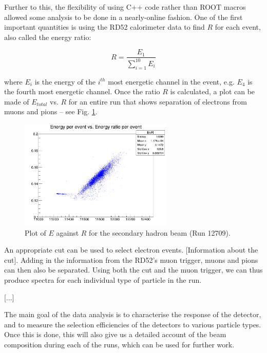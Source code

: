 Further to this, the flexibility of using C++ code rather than ROOT macros allowed some analysis to be done in a nearly-online fashion. One of the first important quantities is using the RD52 calorimeter data to find $R$ for each event, also called the energy ratio:

\begin{displaymath}
	R = \frac{E_1}{\sum_{i=1}^{10} E_i}
\end{displaymath}

where $E_i$ is the energy of the $i^{th}$ most energetic channel in the event, e.g. $E_4$ is the fourth most energetic channel. Once the ratio $R$ is calculated, a plot can be made of $E_{total}$ vs. $R$ for an entire run that shows separation of electrons from muons and pions -- see Fig. \ref{figure:testbeam/results/EvR}.


\begin{figure}[h]
	\centering
	\includegraphics[width=0.65\textwidth]{../Pictures/12709-EvR.png}
	\caption{Plot of $E$ against $R$ for the secondary hadron beam (Run 12709).}
	\label{figure:testbeam/results/EvR}
\end{figure}

An appropriate cut can be used to select electron events. [Information about the cut]. Adding in the information from the RD52's muon trigger, muons and pions can then also be separated. Using both the cut and the muon trigger, we can thus produce spectra for each individual type of particle in the run.

[...]

The main goal of the data analysis is to characterise the response of the detector, and to measure the selection efficiencies of the detectors to various particle types. Once this is done, this will also give us a detailed account of the beam composition during each of the runs, which can be used for further work.

